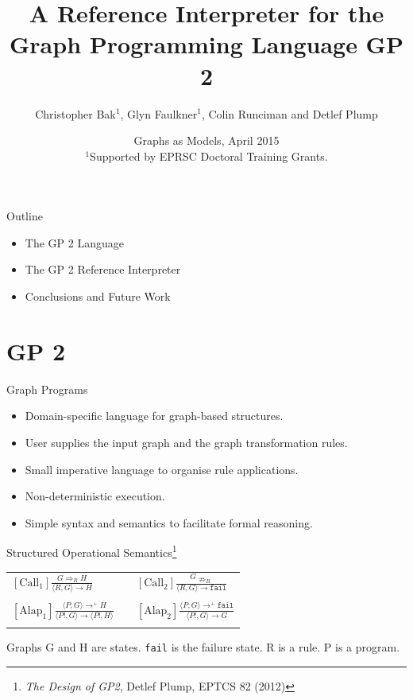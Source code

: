 \documentclass[14pt]{beamer}
\title{\textbf{A Reference Interpreter for the Graph Programming Language GP 2}}
\author{Christopher Bak$^1$, Glyn Faulkner$^1$, Colin Runciman and Detlef Plump}
\institute{Department of Computer Science, The University of York}
\date[GaM 2015]{Graphs as Models, April 2015\\[1em]
{\scriptsize $^1$Supported by EPRSC Doctoral Training Grants.}}
\begin{document}
\begin{frame}
  \titlepage
\end{frame}

\begin{frame}{Outline}
\begin{itemize}\setlength{\itemsep}{10mm}
\item The GP 2 Language
\item The GP 2 Reference Interpreter
\item Conclusions and Future Work
\end{itemize}
\end{frame}

\section{GP 2}

\begin{frame}{Graph Programs}
\begin{itemize}
\item Domain-specific language for graph-based structures.
\item User supplies the input graph and the graph transformation rules.
\item Small imperative language to organise rule applications.
\item Non-deterministic execution.
\item Simple syntax and semantics to facilitate formal reasoning.
\end{itemize}
\end{frame}

\begin{frame}{Structured Operational Semantics\footnote{\textit{The Design of GP2}, Detlef Plump, EPTCS 82 (2012)}}
\begin{center}
\begin{tabular}{lcl}
$\mathrm{[Call_1]} \displaystyle\frac{G \Rightarrow_{R} H}{\langle R,G\rangle \to H}$ 
&&
$\mathrm{[Call_2]} \displaystyle\frac{G \nRightarrow_{R}}{\langle R,G\rangle \to \texttt{fail}}$ 
\\\\
$\mathrm{[Alap_1]} \displaystyle\frac{\langle P, G\rangle \to^+ H}{\langle P!, G\rangle \to \langle P!, H\rangle}$ 
&&
$\mathrm{[Alap_2]} \displaystyle\frac{\langle P, G\rangle \to^+ \texttt{fail}}{\langle P!, G\rangle \to G}$ 
\\\\
\end{tabular} 
\end{center}
\footnotesize{Graphs G and H are states. \texttt{fail} is the failure state. R is a rule. P is a program.}
\end{frame}
\end{document}
